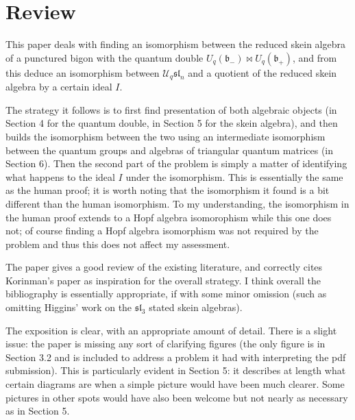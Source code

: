 \documentclass[11pt]{article}
\theoremstyle{remark}
\newcommand{\U}{U_q}
\newcommand{\bp}{\mathfrak b_+}
\newcommand{\bm}{\mathfrak b_-}
\begin{document}
\maketitle

\section{Review}


This paper deals with finding an isomorphism between the reduced skein algebra of a punctured bigon with the quantum double $\U(\bm)\bowtie\U(\bp)$, and from this deduce an isomorphism between $\mathcal{U}_q\mathfrak{sl}_n$ and a quotient of the reduced skein algebra by a certain ideal $I$. 

The strategy it follows is to first find presentation of both algebraic objects (in Section 4 for the quantum double, in Section 5 for the skein algebra), and then builds the isomorphism between the two using an intermediate isomorphism between the quantum groups and algebras of triangular quantum matrices (in Section 6). Then the second part of the problem is simply a matter of identifying what happens to the ideal $I$ under the isomorphism. This is essentially the same as the human proof; it is worth noting that the isomorphism it found is a bit different than the human isomorphism. To my understanding, the isomorphism in the human proof extends to a Hopf algebra isomorophism while this one does not; of course finding a Hopf algebra isomorphism was not required by the problem and thus this does not affect my assessment.

The paper gives a good review of the existing literature, and correctly cites Korinman's paper as inspiration for the overall strategy. I think overall the bibliography is essentially appropriate, if with some minor omission (such as omitting Higgins' work on the $\mathfrak{sl}_3$ stated skein algebras).

The exposition is clear, with an appropriate amount of detail. There is a slight issue: the paper is missing any sort of clarifying figures (the only figure is in Section 3.2 and is included to address a problem it had with interpreting the pdf submission). This is particularly evident in Section 5: it describes at length what certain diagrams are when a simple picture would have been much clearer. Some pictures in other spots would have also been welcome but not nearly as necessary as in Section 5.

\end{document}

